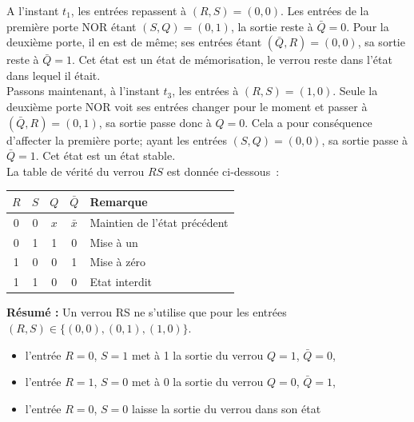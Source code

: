 A l'instant $t_1$, les entrées repassent à $(R,S) = (0,0)$. Les entrées de la première porte NOR étant $(S, Q) = (0, 1)$, la sortie reste à $\bar{Q} = 0$. Pour la deuxième porte, il en est de même; ses entrées étant $(\bar{Q}, R) = (0, 0)$, sa sortie reste à $\bar{Q} = 1$. Cet état est un état de mémorisation, le verrou reste dans l'état dans lequel il était. \\

Passons maintenant, à l'instant $t_3$, les entrées à $(R,S) = (1,0)$. Seule la deuxième porte NOR voit ses entrées changer pour le moment et passer à $(\bar{Q}, R) = (0, 1)$, sa sortie passe donc à $Q = 0$. Cela a pour conséquence d'affecter la première porte; ayant les entrées $(S, Q) = (0, 0)$, sa sortie passe à $\bar{Q} = 1$. Cet état est un état stable. \\

 La table de vérité du verrou $RS$ est donnée ci-dessous~:\\
\begin{center}
\begin{tabular}{cc||ccl}
$R$ & $S$ & $Q$ & $\bar{Q}$ & Remarque\\
\hline
0 & 0 & $x$ & $\bar{x}$ & Maintien de l'état précédent\\
0 & 1 & 1 & 0 & Mise à un\\
1 & 0 & 0 & 1 & Mise à zéro\\
1 & 1 & 0 & 0 & Etat interdit 
\end{tabular}
\end{center}

\begin{framed}
\textbf{Résumé : } Un verrou RS ne s'utilise que pour les entrées $(R,S) \in \{(0,0), (0,1), (1,0)\}$.
\begin{itemize}
\item l'entrée $R=0$, $S=1$ met à 1 la sortie du verrou $Q = 1$, $\bar{Q}=0$,
\item l'entrée $R=1$, $S=0$ met à 0 la sortie du verrou $Q = 0$, $\bar{Q}=1$,
\item l'entrée $R=0$, $S=0$ laisse la sortie du verrou dans son état
\end{itemize}
\end{framed}

